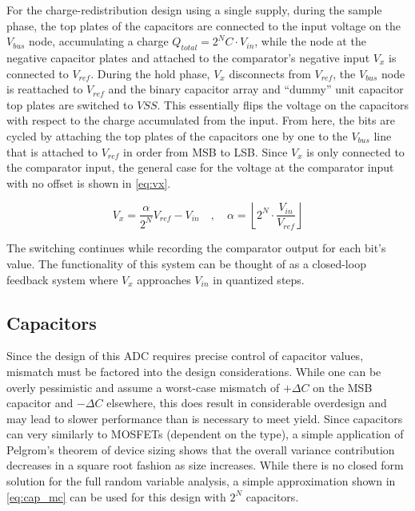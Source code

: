 \documentclass[11pt,letterpaper]{article}
\begin{document}
For the charge-redistribution design using a single supply, during the sample phase, the top plates of the capacitors are connected to the input voltage on the \(V_{bus}\) node, accumulating a charge \(Q_{total} = 2^N C \cdot V_{in}\), while the node at the negative capacitor plates and attached to the comparator's negative input \(V_x\) is connected to \(V_{ref}\). During the hold phase, \(V_x\) disconnects from \(V_{ref}\), the \(V_{bus}\) node is reattached to \(V_{ref}\) and the binary capacitor array and ``dummy'' unit capacitor top plates are switched to \(VSS\). This essentially flips the voltage on the capacitors with respect to the charge accumulated from the input. From here, the bits are cycled by attaching the top plates of the capacitors one by one to the \(V_{bus}\) line that is attached to \(V_{ref}\) in order from MSB to LSB\@. Since \(V_x\) is only connected to the comparator input, the general case for the voltage at the comparator input with no offset is shown in \cref{eq:vx}.

\begin{equation}
    V_x = \frac{\alpha}{2^N}V_{ref} - V_{in} \quad, \quad \alpha = \left\lfloor 2^N \cdot \frac{V_{in}}{V_{ref}} \right\rfloor \label{eq:vx}
\end{equation}

The switching continues while recording the comparator output for each bit's value. The functionality of this system can be thought of as a closed-loop feedback system where \(V_x\) approaches \(V_{in}\) in quantized steps.

\subsection{Capacitors}

Since the design of this ADC requires precise control of capacitor values, mismatch must be factored into the design considerations. While one can be overly pessimistic and assume a worst-case mismatch of \(+\Delta C\) on the MSB capacitor and \(-\Delta C\) elsewhere, this does result in considerable overdesign and may lead to slower performance than is necessary to meet yield. Since capacitors can very similarly to MOSFETs (dependent on the type), a simple application of Pelgrom's theorem of device sizing shows that the overall variance contribution decreases in a square root fashion as size increases. While there is no closed form solution for the full random variable analysis, a simple approximation shown in \cref{eq:cap_mc} can be used for this design with \(2^N\) capacitors.
\end{document}
